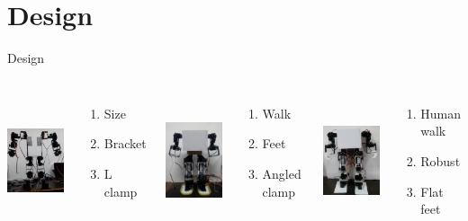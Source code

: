 \documentclass{beamer}
\begin{document}
\section{Design}
\begin{frame}{Design}
\begin{columns}[c] %
	
	\includegraphics[width=3cm,height=4cm]{oned}
	\begin{enumerate}
		\item Size
		\item Bracket
		\item L clamp
	\end{enumerate}
	
	\includegraphics[width=3cm,height=4cm]{IMG_20140607_214454}
	\begin{enumerate}
		\item Walk
		\item Feet
		\item Angled clamp
	\end{enumerate}
	\includegraphics[width=3cm,height=4cm]{body_assembly}
	\begin{enumerate}
			\item Human walk
			\item Robust
			\item Flat feet
	\end{enumerate}
\end{columns}
\end{frame}
\end{document}
